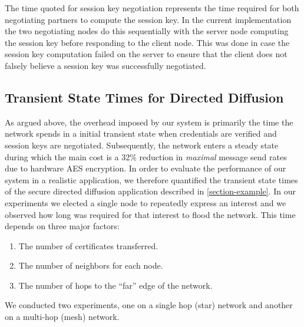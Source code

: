 The time quoted for session key negotiation represents the time required
for both negotiating partners to compute the session key. In the current
implementation the two negotiating nodes do this sequentially with the
server node computing the session key before responding to the client
node. This was done in case the session key computation failed on the
server to ensure that the client does not falsely believe a session key
was successfully negotiated.

\subsection{Transient State Times for Directed Diffusion}

As argued above, the overhead imposed by our system is primarily the time
the network spends in a initial transient state when credentials are
verified and session keys are negotiated. Subsequently, the network 
enters a steady state during which the main cost is a 32\% reduction in 
\emph{maximal} message send rates due to hardware AES encryption. In order
to evaluate the performance of our system in a realistic application, 
we therefore quantified the transient state times of the secure directed
diffusion application described in \autoref{section-example}.
In our experiments we elected a single node to repeatedly
express an interest and we observed how long was required for
that interest to flood the network. This time depends on three major
factors:
\begin{enumerate}
\item The number of certificates transferred.
\item The number of neighbors for each node.
\item The number of hops to the ``far'' edge of the network.
\end{enumerate}
We conducted two experiments, one on a single hop (star) network and 
another on a multi-hop (mesh) network.

